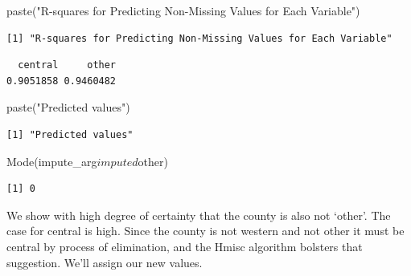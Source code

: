 \documentclass[]{article}
\newenvironment{Shaded}{}{}
\newcommand{\KeywordTok}[1]{\textcolor[rgb]{0.00,0.00,1.00}{#1}}
\newcommand{\NormalTok}[1]{#1}
\newcommand{\OperatorTok}[1]{#1}
\newcommand{\StringTok}[1]{\textcolor[rgb]{0.00,0.50,0.50}{#1}}
\begin{document}
\begin{Shaded}
\begin{Highlighting}[]
\KeywordTok{paste}\NormalTok{(}\StringTok{"R-squares for Predicting Non-Missing Values for Each Variable"}\NormalTok{)}
\end{Highlighting}
\end{Shaded}

\begin{verbatim}
[1] "R-squares for Predicting Non-Missing Values for Each Variable"
\end{verbatim}

\begin{Shaded}
\end{Shaded}

\begin{verbatim}
  central     other 
0.9051858 0.9460482 
\end{verbatim}

\begin{Shaded}
\begin{Highlighting}[]
\KeywordTok{paste}\NormalTok{(}\StringTok{"Predicted values"}\NormalTok{)}
\end{Highlighting}
\end{Shaded}

\begin{verbatim}
[1] "Predicted values"
\end{verbatim}

\begin{Shaded}
\begin{Highlighting}[]
\KeywordTok{Mode}\NormalTok{(impute_arg}\OperatorTok{$}\NormalTok{imputed}\OperatorTok{$}\NormalTok{other)}
\end{Highlighting}
\end{Shaded}

\begin{verbatim}
[1] 0
\end{verbatim}

We show with high degree of certainty that the county is also not
`other'. The case for central is high. Since the county is not western
and not other it must be central by process of elimination, and the
Hmisc algorithm bolsters that suggestion. We'll assign our new values.
\end{document}
